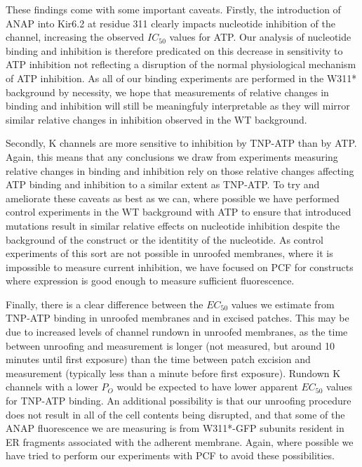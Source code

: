 These findings come with some important caveats.
Firstly, the introduction of ANAP into Kir6.2 at residue 311 clearly impacts nucleotide inhibition of the channel, increasing the observed $IC_{50}$ values for ATP.
Our analysis of nucleotide binding and inhibition is therefore predicated on this decrease in sensitivity to ATP inhibition not reflecting a disruption of the normal physiological mechanism of ATP inhibition.
As all of our binding experiments are performed in the W311* background by necessity, we hope that measurements of relative changes in binding and inhibition will still be meaningfuly interpretable as they will mirror similar relative changes in inhibition observed in the WT background.

Secondly, K\ATP{} channels are more sensitive to inhibition by TNP-ATP than by ATP.
Again, this means that any conclusions we draw from experiments measuring relative changes in binding and inhibition rely on those relative changes affecting ATP binding and inhibition to a similar extent as TNP-ATP.
To try and ameliorate these caveats as best as we can, where possible we have performed control experiments in the WT background with ATP to ensure that introduced mutations result in similar relative effects on nucleotide inhibition despite the background of the construct or the identitity of the nucleotide.
As control experiments of this sort are not possible in unroofed membranes, where it is impossible to measure current inhibition, we have focused on PCF for constructs where expression is good enough to measure sufficient fluorescence.

Finally, there is a clear difference between the $EC_{50}$ values we estimate from TNP-ATP binding in unroofed membranes and in excised patches.
This may be due to increased levels of channel rundown in unroofed membranes, as the time between unroofing and measurement is longer (not measured, but around 10 minutes until first exposure) than the time between patch excision and measurement (typically less than a minute before first exposure).
Rundown K\ATP{} channels with a lower $P_O$ would be expected to have lower apparent $EC_{50}$ values for TNP-ATP binding.
An additional possibility is that our unroofing procedure does not result in all of the cell contents being disrupted, and that some of the ANAP fluorescence we are measuring is from W311*-GFP subunits resident in ER fragments associated with the adherent membrane.
Again, where possible we have tried to perform our experiments with PCF to avoid these possibilities.
